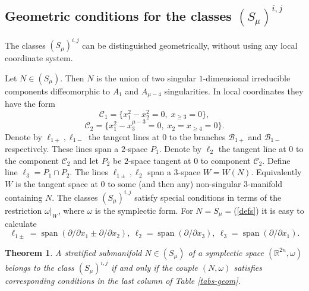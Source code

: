 \documentclass{amsart}
\newtheorem{thm}{Theorem}[section]
\theoremstyle{definition}
\numberwithin{equation}{section}
\begin{document}
\subsection{Geometric conditions for the classes $(S_{\mu})^{i,j}$}
\label{s-geom_cond}

The classes $(S_{\mu})^{i,j}$ can be distinguished geometrically, without using any local coordinate system.

Let $N\in (S_{\mu})$. Then $N$ is the union of two singular $1$-dimensional irreducible components diffeomorphic to $A_1$ and $A_{\mu-4}$ singularities. In local coordinates they have the form
\[\mathcal{C}_1=\{ x_1^2-x_2^2=0,\; x_{\geq 3}=0\},\]
\[\mathcal{C}_2=\{ x_1^2-x_3^{\mu-3}=0,\; x_2=x_{\geq 4}=0\}.\]
 Denote by $\ell _{1+}, \ell _{1-}$ the tangent lines at $0$ to the branches $\mathcal {B}_{1+}$ and $\mathcal {B}_{1-}$ respectively. These lines span a $2$-space $P_1$. Denote by $\ell_2$ the tangent line at $0$ to the component $\mathcal {C}_{2}$ and let $P_2$ be $2$-space tangent at $0$ to component $\mathcal {C}_2$. Define  line $\ell_3 = P_1\cap P_2$.
 The lines $\ell _{1\pm}, \ell _2$ span a  $3$-space $W=W(N)$. Equivalently $W$ is  the tangent space at $0$ to some (and then any) non-singular $3$-manifold containing $N$.
The classes $(S_{\mu})^{i,j}$ satisfy special conditions in terms of the restriction $\omega\vert_ W $, where $\omega $ is the symplectic form.
For $N=S_{\mu}=$(\ref{defs}) it is easy to calculate
\begin{equation}
\label{lines} \ell _{1\pm} = \operatorname{span} (\partial /\partial x_1 \pm \partial /\partial x_2),
\ \ell _2 = \operatorname{span} (\partial /\partial x_3), \ \ell _3 = \operatorname{span} (\partial
/\partial x_1).\end{equation}

\begin{thm}
\label{geom-cond-s} A stratified submanifold $N\in (S_{\mu})$ of a
symplectic space $(\mathbb R^{2n}, \omega )$ belongs to the class
$(S_{\mu})^{i,j}$ if and only if the couple $(N, \omega )$ satisfies corresponding
conditions in the last column of Table \ref{tabs-geom}.
\end{thm}
\end{document}
